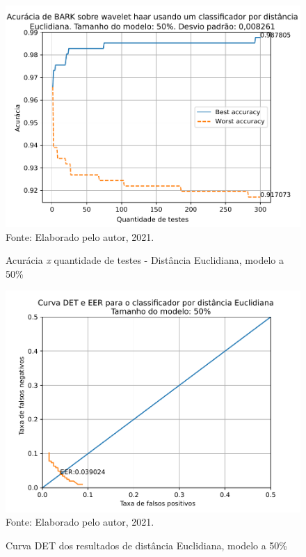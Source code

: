 			\begin{figure}[H]
				\centering
				\caption{Acurácia \textit{x} quantidade de testes - Distância Euclidiana, modelo a 50\%}
				\includegraphics[width=.9\linewidth]{images/results/confusionMatrices/classifier_Euclidian_50}
				\label{fig:classifiereuclidian50}
				\\Fonte: Elaborado pelo autor, 2021.
			\end{figure}
		
			\begin{figure}[H]
				\centering
				\caption{Curva DET dos resultados de distância Euclidiana, modelo a 50\%}
				\includegraphics[width=.9\linewidth]{images/results/det/DET_for_classifier_Euclidian_50}
				\label{fig:detforclassifiereuclidian50}
				\\Fonte: Elaborado pelo autor, 2021.
			\end{figure}
		
